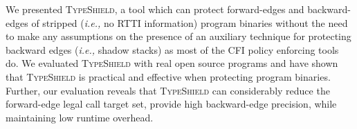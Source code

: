
We presented \textsc{TypeShield}, 
a tool which can protect forward-edges and backward-edges 
of stripped (\textit{i.e.,} no RTTI information) program binaries without the need to make any assumptions
on the presence of an auxiliary technique for protecting backward edges (\textit{i.e.,} shadow stacks) as most 
of the CFI policy enforcing tools do.
We evaluated
\textsc{TypeShield} with real open source programs and have shown that \textsc{TypeShield} 
is practical and effective when protecting program binaries.
Further, our evaluation reveals that \textsc{TypeShield} can considerably reduce the forward-edge legal 
call target set, provide high backward-edge precision, while maintaining low runtime overhead.



